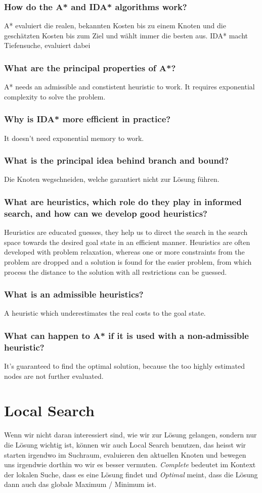 \subsubsection{How do the A* and IDA* algorithms work?}
A* evaluiert die realen, bekannten Kosten bis zu einem Knoten und die geschätzten Kosten bis zum Ziel und wählt immer die besten aus. IDA* macht Tiefensuche, evaluiert dabei 
\subsubsection{What are the principal properties of A*?}
A* needs an admissible and constistent heuristic to work. It requires exponential complexity to solve the problem. 
\subsubsection{Why is IDA* more efficient in practice?}
It doesn't need exponential memory to work.
\subsubsection{What is the principal idea behind branch and bound?}
Die Knoten wegschneiden, welche garantiert nicht zur Lösung führen.
\subsubsection{What are heuristics, which role do they play in informed search, and how can we develop good heuristics?}
Heuristics are educated guesses, they help us to direct the search in the search space towards the desired goal state in an efficient manner. Heuristics are often developed with problem relaxation, whereas one or more constraints from the problem are dropped and a solution is found for the easier problem, from which process the distance to the solution with all restrictions can be guessed.
\subsubsection{What is an admissible heuristics?}
A heuristic which underestimates the real costs to the goal state.
\subsubsection{What can happen to A* if it is used with a non-admissible heuristic?}
It's guaranteed to find the optimal solution, because the too highly estimated nodes are not further evaluated.
\section{Local Search}
Wenn wir nicht daran interessiert sind, wie wir zur Lösung gelangen, sondern nur die Lösung wichtig ist, können wir auch Local Search benutzen, das heisst wir starten irgendwo im Suchraum, evaluieren den aktuellen Knoten und bewegen uns irgendwie dorthin wo wir es besser vermuten. \textit{Complete} bedeutet im Kontext der lokalen Suche, dass es eine Lösung findet und \textit{Optimal} meint, dass die Lösung dann auch das globale Maximum / Minimum ist.

